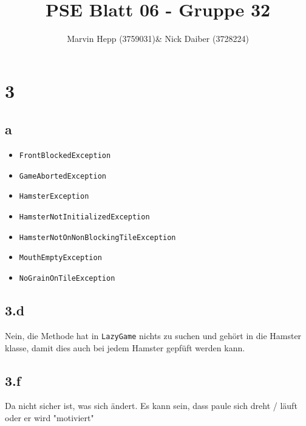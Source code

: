 \documentclass{article}
\title{PSE Blatt 06 - Gruppe 32}
\author{Marvin Hepp (3759031)\& Nick Daiber (3728224)}
\begin{document}
\maketitle
\section*{3}
\subsection*{a}
\begin{itemize}
    \item \verb|FrontBlockedException|
    \item \verb|GameAbortedException|
    \item \verb|HamsterException|
    \item \verb|HamsterNotInitializedException|
    \item \verb|HamsterNotOnNonBlockingTileException|
    \item \verb|MouthEmptyException|
    \item \verb|NoGrainOnTileException|
\end{itemize}
\subsection*{3.d}
Nein, die Methode hat in \verb|LazyGame| nichts zu suchen und gehört
in die Hamster klasse, damit dies auch bei jedem Hamster gepfüft werden kann.
\subsection*{3.f}
Da nicht sicher ist, was sich ändert.
Es kann sein, dass paule sich dreht / läuft oder er wird "motiviert"
\end{document}
